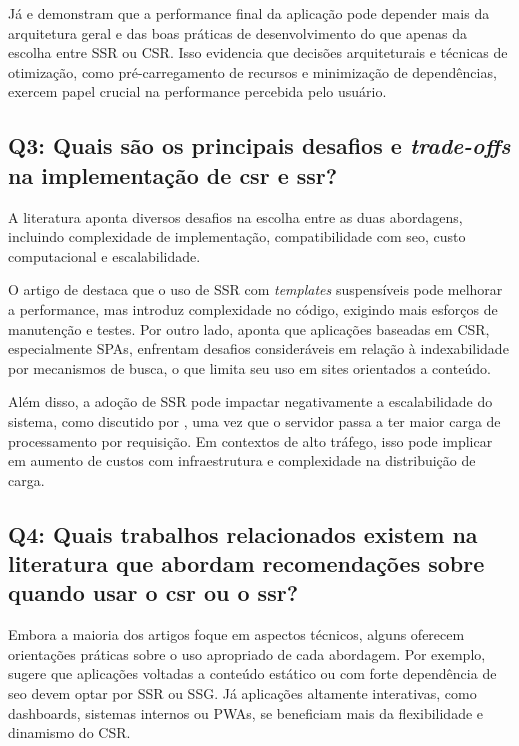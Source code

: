 Já \cite{Bekmanova2024265} e \cite{Klochkov2021} demonstram que a performance final da aplicação pode depender mais da arquitetura geral e das boas práticas de desenvolvimento do que apenas da escolha entre SSR ou CSR. Isso evidencia que decisões arquiteturais e técnicas de otimização, como pré-carregamento de recursos e minimização de dependências, exercem papel crucial na performance percebida pelo usuário.

\subsection{Q3: Quais são os principais desafios e \textit{trade-offs} na implementação de \acrshort{csr} e \acrshort{ssr}?}

A literatura aponta diversos desafios na escolha entre as duas abordagens, incluindo complexidade de implementação, compatibilidade com \acrshort{seo}, custo computacional e escalabilidade.

O artigo de \cite{Carvalho2025458} destaca que o uso de SSR com \textit{templates} suspensíveis pode melhorar a performance, mas introduz complexidade no código, exigindo mais esforços de manutenção e testes. Por outro lado, \cite{Kowalczyk202411597} aponta que aplicações baseadas em CSR, especialmente SPAs, enfrentam desafios consideráveis em relação à indexabilidade por mecanismos de busca, o que limita seu uso em sites orientados a conteúdo.

Além disso, a adoção de SSR pode impactar negativamente a escalabilidade do sistema, como discutido por \cite{Angkasa2023}, uma vez que o servidor passa a ter maior carga de processamento por requisição. Em contextos de alto tráfego, isso pode implicar em aumento de custos com infraestrutura e complexidade na distribuição de carga.

\subsection{Q4: Quais trabalhos relacionados existem na literatura que abordam recomendações sobre quando usar o \acrshort{csr} ou o \acrshort{ssr}?}

Embora a maioria dos artigos foque em aspectos técnicos, alguns oferecem orientações práticas sobre o uso apropriado de cada abordagem. Por exemplo, \cite{FadhilahIskandar2020} sugere que aplicações voltadas a conteúdo estático ou com forte dependência de \acrshort{seo} devem optar por SSR ou SSG. Já aplicações altamente interativas, como dashboards, sistemas internos ou PWAs, se beneficiam mais da flexibilidade e dinamismo do CSR.

